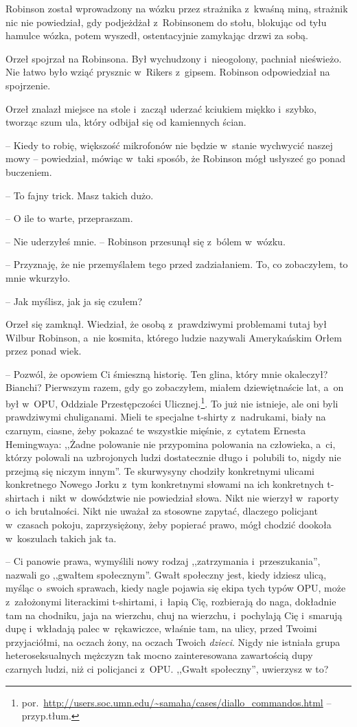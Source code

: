 \documentclass[oneside,polish,11pt,sfheadings]{mwbk}
\begin{document}
Robinson został wprowadzony na wózku przez strażnika z~kwaśną miną,
strażnik nic nie powiedział, gdy podjeżdżał z~Robinsonem do stołu,
blokując od tyłu hamulce wózka, potem wyszedł, ostentacyjnie zamykając
drzwi za sobą.

Orzeł spojrzał na Robinsona. Był wychudzony i~nieogolony, pachniał
nieświeżo. Nie łatwo było wziąć prysznic w~Rikers z~gipsem. Robinson
odpowiedział na spojrzenie.

Orzeł znalazł miejsce na stole i~zaczął uderzać kciukiem miękko i~szybko, tworząc szum ula, który odbijał się od kamiennych ścian. 

-- Kiedy
to robię, większość mikrofonów nie będzie w~stanie wychwycić naszej mowy
-- powiedział, mówiąc w~taki sposób, że Robinson mógł usłyszeć go ponad
buczeniem.

-- To fajny trick. Masz takich dużo.

-- O ile to warte, przepraszam.

-- Nie uderzyłeś mnie. -- Robinson przesunął się z~bólem w~wózku.

-- Przyznaję, że nie przemyślałem tego przed zadziałaniem. To, co
zobaczyłem, to mnie wkurzyło.

-- Jak myślisz, jak ja się czułem?

Orzeł się zamknął. Wiedział, że osobą z~prawdziwymi problemami tutaj był
Wilbur Robinson, a~nie kosmita, którego ludzie nazywali Amerykańskim
Orłem przez ponad wiek.

-- Pozwól, że opowiem Ci śmieszną historię. Ten glina, który mnie
okaleczył? Bianchi? Pierwszym razem, gdy go zobaczyłem, miałem
dziewiętnaście lat, a~on był w~OPU, Oddziale Przestępczości
Ulicznej.\footnote{
por.~\url{http://users.soc.umn.edu/~samaha/cases/diallo\_commandos.html}
-- przyp.tłum.}. To już nie istnieje, ale oni byli prawdziwymi
chuliganami. Mieli te specjalne t-shirty z~nadrukami, biały na czarnym,
ciasne, żeby pokazać te wszystkie mięśnie, z~cytatem Ernesta Hemingwaya:
,,Żadne polowanie nie przypomina polowania na człowieka, a~ci, którzy
polowali na uzbrojonych ludzi dostatecznie długo i~polubili to, nigdy
nie przejmą się niczym innym''. Te skurwysyny chodziły konkretnymi
ulicami konkretnego Nowego Jorku z~tym konkretnymi słowami na ich
konkretnych t-shirtach i~nikt w~dowództwie nie powiedział słowa. Nikt
nie wierzył w~raporty o~ich brutalności. Nikt nie uważał za stosowne
zapytać, dlaczego policjant w~czasach pokoju, zaprzysiężony, żeby
popierać prawo, mógł chodzić dookoła w~koszulach takich jak ta.

-- Ci panowie prawa, wymyślili nowy rodzaj ,,zatrzymania i~przeszukania'', nazwali go ,,gwałtem społecznym''. Gwałt społeczny jest,
kiedy idziesz ulicą, myśląc o~swoich sprawach, kiedy nagle pojawia się
ekipa tych typów OPU, może z~założonymi literackimi t-shirtami, i~łapią
Cię, rozbierają do naga, dokładnie tam na chodniku, jaja na wierzchu,
chuj na wierzchu, i~pochylają Cię i~smarują dupę i~wkładają palec w~rękawiczce, właśnie tam, na ulicy, przed Twoimi przyjaciółmi, na oczach
żony, na oczach Twoich \textit{dzieci}. Nigdy nie istniała grupa
heteroseksualnych mężczyzn tak mocno zainteresowana zawartością dupy
czarnych ludzi, niż ci policjanci z~OPU. ,,Gwałt społeczny'', uwierzysz
w to?
\end{document}
